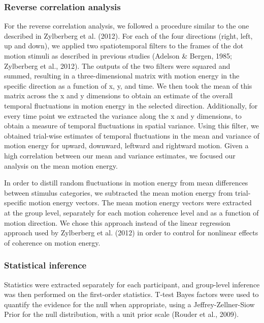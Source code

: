 \documentclass[12pt,twoside]{reedthesis}
\begin{document}
\hypertarget{reverse-correlation-analysis}{%
\subsubsection*{Reverse correlation analysis}\label{reverse-correlation-analysis}}

For the reverse correlation analysis, we followed a procedure similar to the one described in Zylberberg et al. (2012). For each of the four directions (right, left, up and down), we applied two spatiotemporal filters to the frames of the dot motion stimuli as described in previous studies (Adelson \& Bergen, 1985; Zylberberg et al., 2012). The outputs of the two filters were squared and summed, resulting in a three-dimensional matrix with motion energy in the specific direction as a function of x, y, and time. We then took the mean of this matrix across the x and y dimensions to obtain an estimate of the overall temporal fluctuations in motion energy in the selected direction. Additionally, for every time point we extracted the variance along the x and y dimensions, to obtain a measure of temporal fluctuations in spatial variance. Using this filter, we obtained trial-wise estimates of temporal fluctuations in the mean and variance of motion energy for upward, downward, leftward and rightward motion. Given a high correlation between our mean and variance estimates, we focused our analysis on the mean motion energy.

In order to distill random fluctuations in motion energy from mean differences between stimulus categories, we subtracted the mean motion energy from trial-specific motion energy vectors. The mean motion energy vectors were extracted at the group level, separately for each motion coherence level and as a function of motion direction. We chose this approach instead of the linear regression approach used by Zylberberg et al. (2012) in order to control for nonlinear effects of coherence on motion energy.

\hypertarget{statistical-inference-1}{%
\subsubsection*{Statistical inference}\label{statistical-inference-1}}

Statistics were extracted separately for each participant, and group-level inference was then performed on the first-order statistics. T-test Bayes factors were used to quantify the evidence for the null when appropriate, using a Jeffrey-Zellner-Siow Prior for the null distribution, with a unit prior scale (Rouder et al., 2009).
\end{document}
